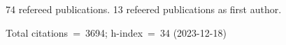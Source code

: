 74 refereed publications. 13 refeered publications as first author.

Total citations~=~3694; h-index~=~34 (2023-12-18)
